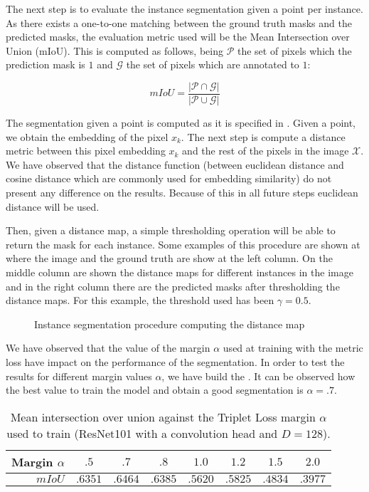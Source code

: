 The next step is to evaluate the instance segmentation given a point per instance.
As there exists a one-to-one matching between the ground truth masks and the predicted masks, the evaluation metric used will be the Mean Intersection over Union (mIoU).
This is computed as follows, being $\mathcal{P}$ the set of pixels which the prediction mask is $1$ and $\mathcal{G}$ the set of pixels which are annotated to $1$:

\begin{equation}
  mIoU = \frac{|\mathcal{P} \cap \mathcal{G}|}{|\mathcal{P} \cup \mathcal{G}|}
\end{equation}

The segmentation given a point is computed as it is specified in .
Given a point, we obtain the embedding of the pixel $x_k$.
The next step is compute a distance metric between this pixel embedding $x_k$ and the rest of the pixels in the image $\mathcal{X}$.
We have observed that the distance function (between euclidean distance and cosine distance which are commonly used for embedding similarity) do not present any difference on the results.
Because of this in all future steps euclidean distance will be used.

Then, given a distance map, a simple thresholding operation will be able to return the mask for each instance.
Some examples of this procedure are shown at  where the image and the ground truth are show at the left column.
On the middle column are shown the distance maps for different instances in the image and in the right column there are the predicted masks after thresholding the distance maps.
For this example, the threshold used has been $\gamma = 0.5$.

\begin{figure}[h]
  \centering
  \caption{Instance segmentation procedure computing the distance map}
  \label{fig:distance_maps}
\end{figure}

We have observed that the value of the margin $\alpha$ used at training with the metric loss have impact on the performance of the segmentation.
In order to test the results for different margin values $\alpha$, we have build the .
It can be observed how the best value to train the model and obtain a good segmentation is $\alpha = .7$.

\begin{table}[h]
  \centering
  \begin{tabular}{r|ccccccc}
    \toprule
    Margin $\alpha$ & $.5$    & $\mathbf{.7}$    & $.8$    & $1.0$   & $1.2$   & $1.5$   & $2.0$   \\
    \midrule
    $mIoU$          & $.6351$ & $\mathbf{.6464}$ & $.6385$ & $.5620$ & $.5825$ & $.4834$ & $.3977$ \\
    \bottomrule
  \end{tabular}
  \caption{Mean intersection over union against the Triplet Loss margin $\alpha$ used to train (ResNet101 with a convolution head and $D=128$). }
  \label{tab:margin_miou}
\end{table}


